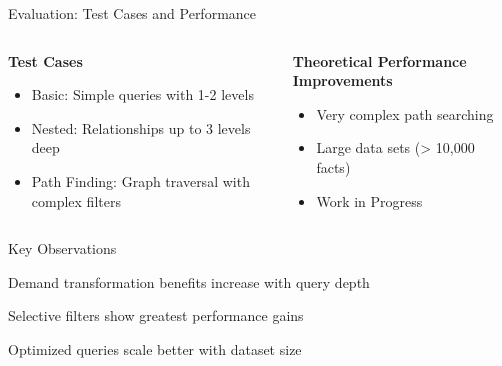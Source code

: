\documentclass{beamer}
\begin{document}
\begin{frame}{Evaluation: Test Cases and Performance}
  \begin{columns}[T]
    \begin{column}{0.48\textwidth}
      \textbf{Test Cases}
      \begin{itemize}
        \item Basic: Simple queries with 1-2 levels
        \item Nested: Relationships up to 3 levels deep
        \item Path Finding: Graph traversal with complex filters
      \end{itemize}
    \end{column}
    \begin{column}{0.48\textwidth}
      \textbf{Theoretical Performance Improvements}
      \begin{itemize}
            \item Very complex path searching
            \item Large data sets (> 10,000 facts)
            \item Work in Progress
      \end{itemize}
    \end{column}
  \end{columns}
  
  \begin{block}{Key Observations}
    \item Demand transformation benefits increase with query depth
    \item Selective filters show greatest performance gains
    \item Optimized queries scale better with dataset size
  \end{block}
\end{frame}

\end{document}
